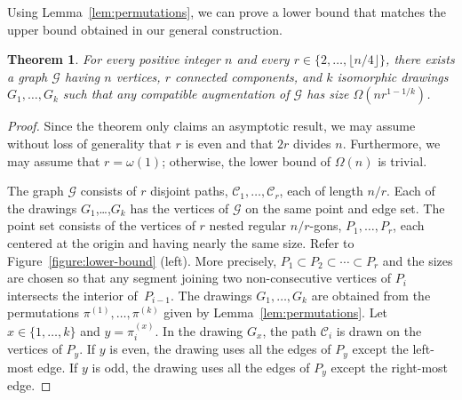 \documentclass[11pt]{patmorin}
\newtheorem{theorem}{Theorem}[section]
\begin{document}
Using Lemma~\ref{lem:permutations}, we can prove a lower bound that matches the upper bound obtained in our general construction.

\begin{theorem}\label{thm:lower-bound}
  For every positive integer $n$ and every $r\in\{2,\ldots,\lfloor n/4\rfloor\}$,
  there exists a graph $\mathcal G$ having $n$ vertices, $r$ connected
  components, and $k$ isomorphic drawings $G_1,\ldots,G_k$ such that
  any compatible augmentation of $\mathcal G$ has size $\Omega(nr^{1-1/k})$.
\end{theorem}

\begin{proof}
Since the theorem only claims an asymptotic result, we may assume without
loss of generality that $r$ is even and that $2r$ divides $n$. 
Furthermore, we may assume that $r = \omega(1)$; otherwise, the lower bound of $\Omega(n)$ is trivial. 

The graph $\mathcal G$ consists of $r$ disjoint paths,
$\mathcal{C}_1,\ldots,\mathcal{C}_r$, each of length $n/r$.  Each of the
drawings $G_1$,\ldots,$G_k$ has the vertices of $\mathcal G$ on the
same point and edge set. The point set consists of the vertices of
$r$ nested regular $n/r$-gons, $P_1,\ldots,P_r$, each centered at the
origin and having nearly the same size. Refer to Figure~\ref{figure:lower-bound} (left). More precisely, $P_1\subset
P_2\subset\cdots\subset P_r$ and the sizes are chosen so that any segment
joining two non-consecutive vertices of $P_i$ intersects the interior
of~$P_{i-1}$.
The drawings $G_1,\ldots,G_k$ are obtained from the permutations
$\pi^{(1)},\ldots,\pi^{(k)}$ given by Lemma~\ref{lem:permutations}.
Let $x\in \{1, \ldots, k\}$ and $y = \pi^{(x)}_i$.
In the drawing $G_x$, the path $\mathcal C_i$ is drawn on the vertices
of $P_{y}$. If $y$ is even, the drawing uses
all the edges of $P_y$ except the left-most edge.  If $y$ is odd, the
drawing uses all the edges of $P_y$ except the right-most edge.


\end{proof}
\end{document}
